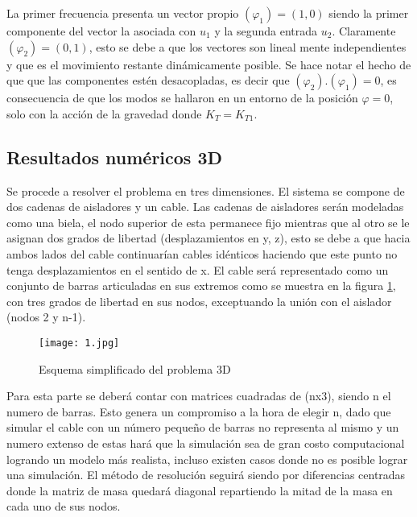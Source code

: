 La primer frecuencia presenta un vector propio   $(\varphi_1)=(1,0)$ siendo la primer componente del vector  la asociada con $u_1$ y la segunda entrada  $u_2$. Claramente  $(\varphi_2)=(0,1)$, esto se debe a que los vectores son lineal mente independientes y que es el movimiento restante dinámicamente posible. Se hace notar el hecho de que que las componentes estén desacopladas, es decir que $(\varphi_2).(\varphi_1)=0$, es consecuencia de que los modos se hallaron en un entorno de la posición $\varphi=0$, solo con la acción de la gravedad donde $K_T=K_{T1}$.

\subsection{Resultados numéricos 3D}
Se procede a resolver el problema en tres dimensiones. El sistema se compone de dos cadenas de aisladores y un cable. Las cadenas de aisladores serán modeladas como una biela, el nodo superior de esta permanece fijo mientras que al otro se le asignan dos grados de libertad (desplazamientos en y, z), esto se debe a que hacia ambos lados del cable continuarían cables idénticos haciendo que este punto no tenga desplazamientos en el sentido de x. El cable será representado como un conjunto de barras articuladas en sus extremos como se muestra en la figura \ref{13dddddd}, con tres grados de libertad en sus nodos, exceptuando la unión con el aislador (nodos 2 y n-1).


\begin{figure}[h]
	\centering
	\texttt{[image: 1.jpg]}
	\caption{Esquema simplificado del problema 3D}
	\label{13dddddd}
\end{figure}

Para esta parte se deberá contar con matrices cuadradas de (nx3), siendo n el numero de barras. Esto genera un compromiso a la hora de elegir n, dado que simular el cable con un número pequeño de barras no representa al mismo y un numero extenso de estas hará que la simulación sea de gran costo computacional logrando un modelo más realista, incluso existen casos donde no es posible lograr una simulación. El método de resolución seguirá siendo por diferencias centradas donde la matriz de masa quedará diagonal repartiendo la mitad de la masa en cada uno de sus nodos.


